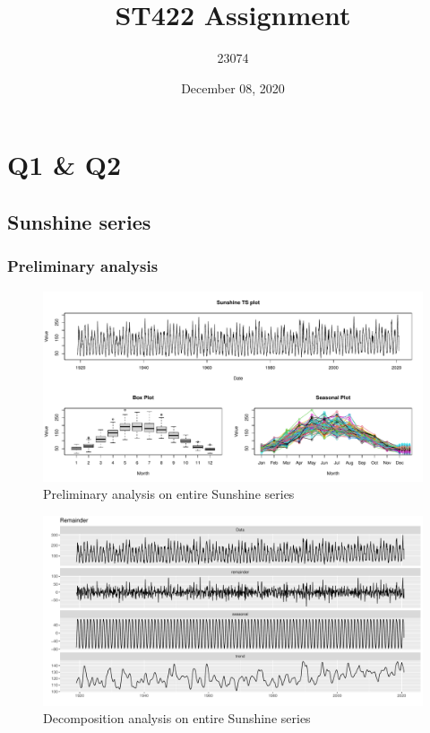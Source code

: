 \documentclass[
  11pt,
]{article}
\title{ST422 Assignment}
\author{23074}
\date{December 08, 2020}
\begin{document}
\maketitle

{
\setcounter{tocdepth}{3}
\tableofcontents
}
\newpage

\hypertarget{q1-q2}{%
\section{Q1 \& Q2}\label{q1-q2}}

\hypertarget{sunshine-series}{%
\subsection{Sunshine series}\label{sunshine-series}}

\hypertarget{preliminary-analysis}{%
\subsubsection{Preliminary analysis}\label{preliminary-analysis}}

\begin{figure}
\centering
\includegraphics{ST422_files/figure-latex/unnamed-chunk-4-1.pdf}
\caption{Preliminary analysis on entire Sunshine series}
\end{figure}

\begin{figure}
\centering
\includegraphics{ST422_files/figure-latex/unnamed-chunk-5-1.pdf}
\caption{Decomposition analysis on entire Sunshine series}
\end{figure}
\end{document}
